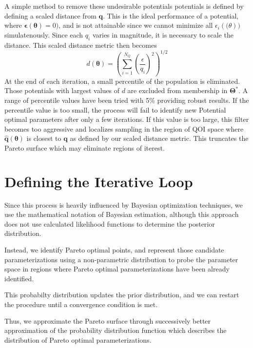 	A simple method to remove these undesirable potentials potentials is defined by defining a scaled distance from $\bm{q}$.  This is the ideal performance of a potential, where $\bm{\epsilon}(\bm{\theta})=0)$, and is not attainable since we cannot minimize all $\epsilon_i(\bm(\theta))$ simulatenously.  Since each $q_i$ varies in magnitude, it is necessary to scale the distance.  This scaled distance metric then becomes
	\begin{equation}
		d(\bm{\theta}) = \left(\sum_{i=1}^{N_Q} \left(\frac{\epsilon}{q_i}\right)^2\right)^{1/2}
	\end{equation}
	At the end of each iteration, a small percentile of the population is eliminated.  Those potentials with largest values of $d$ are excluded from membership in $\bm{\Theta}^*$.  A range of percentile values have been tried with 5\% providing robust results.  If the percentile value is too small, the process will fail to identify new Potential optimal parameters after only a few iterations.  If this value is too large, this filter becomes too aggressive and localizes sampling in the region of QOI space where $\hat{\bm{q}}(\bm{\theta})$ is closest to $\bm{q}$ as defined by our scaled distance metric.  This truncates the Pareto surface which may eliminate regions of iterest.

\section{Defining the Iterative Loop}
\label{sec:iterative_loop}
Since this process is heavily influenced by Bayesian optimization techniques, we use the mathematical notation of Bayesian estimation, although this approach does not use calculated likelihood functions to determine the posterior distribution.

Instead, we identify Pareto optimal points, and represent those candidate parameterizations using a non-parametric distribution to probe the parameter space in regions where Pareto optimal parameterizations have been already identified.

This probabilty distribution updates the prior distribution, and we can restart the procedure until a convergence condition is met.

Thus, we approximate the Pareto surface through successively better approximation of the probability distribution function which describes the distribution of Pareto optimal parameterizations.


